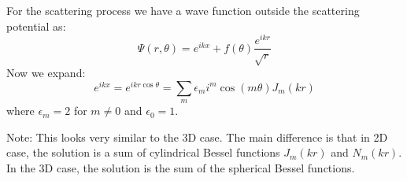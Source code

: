 For the scattering process we have a wave function outside the scattering potential as:
\begin{equation}\label{sctPhi}
 \Psi(r,\theta) = e^{ikx} + f(\theta)\frac{e^{ikr}}{\sqrt{r}}
\end{equation}
Now we expand:
\begin{equation}\label{expE}
e^{ikx} = e^{ikr\cos\theta} = \sum_m{\epsilon_m i^m \cos(m\theta)J_m(kr)}
\end{equation}
where $\epsilon_m = 2 $ for $ m \neq 0 $ and $ \epsilon_0 = 1 $.

Note: This looks very similar to the 3D case. The main difference is that in 2D case, the solution is a sum of cylindrical Bessel functions $ J_m(kr) $ and $ N_m(kr) $.
In the 3D case, the solution is the sum of the spherical Bessel functions.


